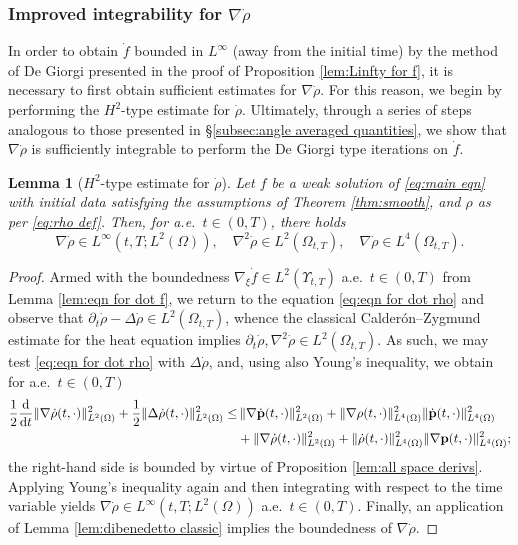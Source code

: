 \documentclass[11pt,a4paper,reqno]{amsart}
\newtheorem{lemma}[prop]{Lemma}
\theoremstyle{remark}
\theoremstyle{definition}
\numberwithin{equation}{section}
\newcommand{\p}{{\bf p}}
\newcommand{\bxi}{\xi}
\newcommand{\der}{\mathrm{d}}
\begin{document}
\subsubsection{Improved integrability for $\nabla\dot{\rho}$}

In order to obtain $\dot{f}$ bounded in $L^\infty$ (away from the initial time) by the method of De Giorgi presented in the proof of Proposition \ref{lem:Linfty for f}, it is necessary to first obtain sufficient estimates for $\nabla \dot{\rho}$. For this reason, we begin by performing the $H^2$-type estimate for $\dot{\rho}$. Ultimately, through a series of steps analogous to those presented in \S \ref{subsec:angle averaged quantities}, we show that $\nabla \dot{\rho}$ is sufficiently integrable to perform the De Giorgi type iterations on $\dot{f}$.

\begin{lemma}[$H^2$-type estimate for $\dot{\rho}$]\label{lem:H2 dot rho}
   Let $f$ be a weak solution of \eqref{eq:main eqn} with initial data satisfying the assumptions of Theorem \ref{thm:smooth}, and $\rho$ as per \eqref{eq:rho def}. Then, for a.e.~$t \in (0,T)$, there holds 
    \begin{equation*}
        \nabla \dot{\rho} \in L^\infty(t,T;L^2(\Omega)), \quad \nabla^2 \dot{\rho} \in L^2(\Omega_{t,T}), \quad \nabla \dot{\rho} \in L^4(\Omega_{t,T}). 
    \end{equation*}
\end{lemma}
\begin{proof}
    Armed with the boundedness $\nabla_{\bxi} \dot{f} \in L^2(\Upsilon_{t,T})$ a.e.~$t \in (0,T)$ from Lemma \ref{lem:eqn for dot f}, we return to the equation \eqref{eq:eqn for dot rho} and observe that $\partial_t \dot{\rho} - \Delta \dot{\rho} \in L^2(\Omega_{t,T})$, whence the classical Calder\'on--Zygmund estimate for the heat equation implies $\partial_t \dot{\rho} , \nabla^2 \dot{\rho} \in L^2(\Omega_{t,T})$. As such, we may test \eqref{eq:eqn for dot rho} with $\Delta \dot{\rho}$, and, using also Young's inequality, we obtain for a.e.~$t\in(0,T)$ 
    \begin{equation*}
      \begin{aligned}  \frac{1}{2}\frac{\der}{\der t} \Vert\nabla \dot{\rho}(t,\cdot)\Vert_{L^2(\Omega)}^2 + \frac{1}{2}\Vert \Delta \dot{\rho}(t,\cdot)\Vert_{L^2(\Omega)}^2 \leq & \, \Vert \nabla \dot{\p}(t,\cdot)\Vert_{L^2(\Omega)}^2 + \Vert \nabla \rho(t,\cdot)\Vert^2_{L^4(\Omega)}\Vert \dot{\p}(t,\cdot) \Vert^2_{L^4(\Omega)} \\ 
      &+ \Vert\nabla \dot{\rho}(t,\cdot)\Vert_{L^2(\Omega)}^2 + \Vert \dot{\rho}(t,\cdot) \Vert^2_{L^4(\Omega)}\Vert \nabla \p(t,\cdot)\Vert^2_{L^4(\Omega)}; 
      \end{aligned}
    \end{equation*}
    the right-hand side is bounded by virtue of Proposition \ref{lem:all space derivs}. Applying Young's inequality again and then integrating with respect to the time variable yields $\nabla \dot{\rho} \in L^\infty(t,T;L^2(\Omega))$ a.e.~$t \in (0,T)$. Finally, an application of Lemma \ref{lem:dibenedetto classic} implies the boundedness of $\nabla \dot{\rho}$. 
\end{proof}
\end{document}

